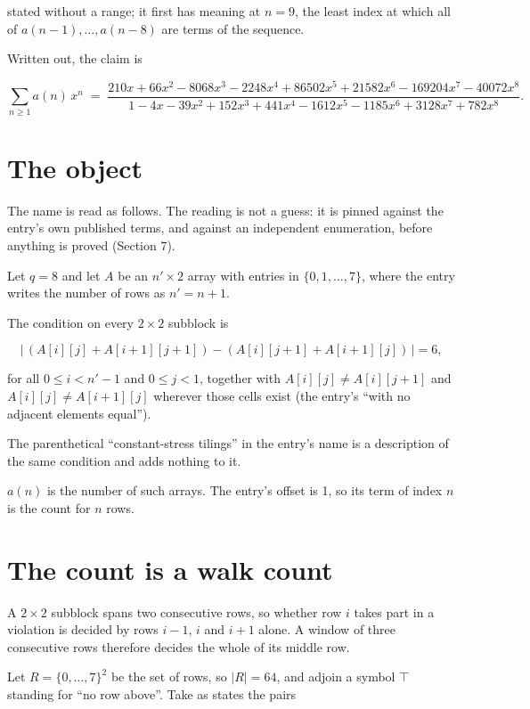 \documentclass[11pt]{article}
\theoremstyle{definition}
\begin{document}
stated without a range; it first has meaning at $n = 9$, the least index at which all of $a(n-1),\dots,a(n-8)$ are terms of the sequence.

Written out, the claim is

\[\sum_{n \ge 1} a(n)\,x^n \;=\; \frac{210x + 66x^{2} - 8068x^{3} - 2248x^{4} + 86502x^{5} + 21582x^{6} - 169204x^{7} - 40072x^{8}}{1 - 4x - 39x^{2} + 152x^{3} + 441x^{4} - 1612x^{5} - 1185x^{6} + 3128x^{7} + 782x^{8}}.\]

\section{The object}

The name is read as follows. The reading is not a guess: it is pinned against the entry's own published terms, and against an independent enumeration, before anything is proved (Section 7).

Let $q = 8$ and let $A$ be an $n' \times 2$ array with entries in $\{0,1,\dots,7\}$, where the entry writes the number of rows as $n' = n + 1$.

The condition on every $2 \times 2$ subblock is

\[\bigl|\,(A[i][j] + A[i{+}1][j{+}1]) - (A[i][j{+}1] + A[i{+}1][j])\,\bigr| = 6,\]

for all $0 \le i < n'-1$ and $0 \le j < 1$, together with $A[i][j] \ne A[i][j{+}1]$ and $A[i][j] \ne A[i{+}1][j]$ wherever those cells exist (the entry's ``with no adjacent elements equal'').

The parenthetical ``constant-stress tilings'' in the entry's name is a description of the same condition and adds nothing to it.

$a(n)$ is the number of such arrays. The entry's offset is 1, so its term of index $n$ is the count for $n$ rows.

\section{The count is a walk count}

A $2 \times 2$ subblock spans two consecutive rows, so whether row $i$ takes part in a violation is decided by rows $i-1$, $i$ and $i+1$ alone. A window of three consecutive rows therefore decides the whole of its middle row.

Let $R = \{0,\dots,7\}^{2}$ be the set of rows, so $|R| = 64$, and adjoin a symbol $\top$ standing for ``no row above''. Take as states the pairs
\end{document}
